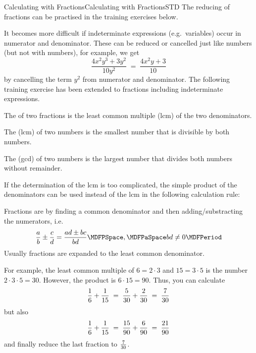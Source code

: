 \begin{MXContent}{Calculating with Fractions}{Calculating with Fractions}{STD}
The reducing of fractions can be practised in the training exercises below.

\newpage

It becomes more difficult if indeterminate expressions (e.g.\ variables) occur in 
numerator and denominator. These can be reduced or cancelled just like numbers (but not 
with numbers), for example, we get
$$
\frac{4x^2y^3+3y^2}{10y^2} \;=\; \frac{4x^2y+3}{10}
$$
by cancelling the term $y^2$ from numerator and denominator. The following training exercise
has been extended to fractions including indeterminate expressions.



\begin{MInfo}
The  of two fractions
is the least common multiple (lcm) of the two denominators.

The  (lcm) of two numbers is the smallest number that 
is divisible by both numbers.

The  (gcd) of two numbers is the largest number that
divides both numbers without remainder.
\end{MInfo}

If the determination of the lcm is too complicated, the 
simple product of the denominators can be used instead of the lcm in the following 
calculation rule:


\begin{MInfo}
Fractions are  by finding
a common denominator and then adding/substrac\-ting the numerators, i.e.
$$\Mdfrac{a}{b} \pm \Mdfrac{c}{d} = \Mdfrac{a d\pm b c}{b d} \MDFPSpace, \MDFPaSpace b d\neq 0 \MDFPeriod$$
Usually fractions are expanded to the least common denominator.
\end{MInfo}

For example, the least common multiple of $6=2\cdot 3$ and $15=3\cdot 5$ is the number 
$2\cdot3\cdot 5=30$. However, the product is $6\cdot 15=90$. Thus, you can calculate
$$
\dfrac{1}{6}+\dfrac{1}{15} \;=\; \dfrac{5}{30}+\dfrac{2}{30} \;=\; \dfrac{7}{30}
$$
but also
$$
\dfrac{1}{6}+\dfrac{1}{15} \;=\; \dfrac{15}{90}+\dfrac{6}{90} \;=\; \dfrac{21}{90}
$$
and finally reduce the last fraction to $\tfrac{7}{30}$.


\end{MXContent}
